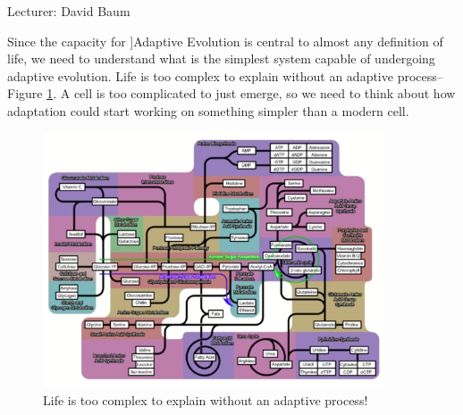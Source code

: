 \documentclass[]{article}
\begin{document}
Lecturer: David Baum

Since the capacity for ]Adaptive Evolution is central to almost any definition of life, we need to understand what is the simplest system capable of undergoing adaptive evolution. Life is too complex to explain without an adaptive
process--Figure \ref{fig:LifeTooComplex}\cite{hoyle1983intelligent}. A cell is too complicated to  just emerge, so we need to think about how adaptation could start working on something simpler than a modern cell.

\begin{figure}[H]
	\caption{Life is too complex to explain without an adaptive
		process!}\label{fig:LifeTooComplex}
	\includegraphics[width=0.9\textwidth]{LifeTooComplex}
\end{figure}
\end{document}
